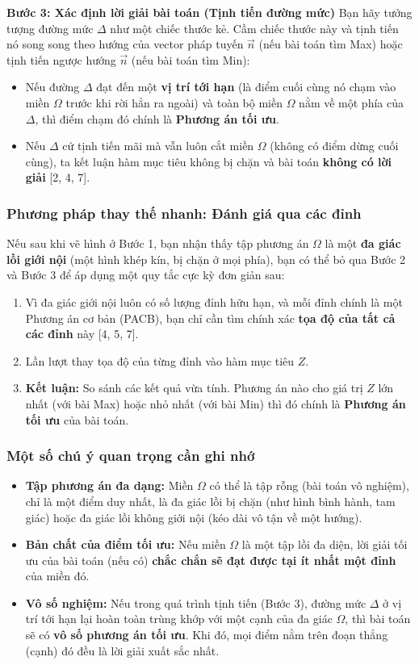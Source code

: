 \textbf{Bước 3: Xác định lời giải bài toán (Tịnh tiến đường mức)}
Bạn hãy tưởng tượng đường mức $\Delta$ như một chiếc thước kẻ. Cầm chiếc thước này và tịnh tiến nó song song theo hướng của vector pháp tuyến $\vec{n}$ (nếu bài toán tìm Max) hoặc tịnh tiến ngược hướng $\vec{n}$ (nếu bài toán tìm Min):
\begin{itemize}
    \item Nếu đường $\Delta$ đạt đến một \textbf{vị trí tới hạn} (là điểm cuối cùng nó chạm vào miền $\Omega$ trước khi rời hẳn ra ngoài) và toàn bộ miền $\Omega$ nằm về một phía của $\Delta$, thì điểm chạm đó chính là \textbf{Phương án tối ưu}.
    \item Nếu $\Delta$ cứ tịnh tiến mãi mà vẫn luôn cắt miền $\Omega$ (không có điểm dừng cuối cùng), ta kết luận hàm mục tiêu không bị chặn và bài toán \textbf{không có lời giải} [2, 4, 7].
\end{itemize}

\subsubsection{Phương pháp thay thế nhanh: Đánh giá qua các đỉnh}
Nếu sau khi vẽ hình ở Bước 1, bạn nhận thấy tập phương án $\Omega$ là một \textbf{đa giác lồi giới nội} (một hình khép kín, bị chặn ở mọi phía), bạn có thể bỏ qua Bước 2 và Bước 3 để áp dụng một quy tắc cực kỳ đơn giản sau:

\begin{enumerate}
    \item Vì đa giác giới nội luôn có số lượng đỉnh hữu hạn, và mỗi đỉnh chính là một Phương án cơ bản (PACB), bạn chỉ cần tìm chính xác \textbf{tọa độ của tất cả các đỉnh} này [4, 5, 7].
    \item Lần lượt thay tọa độ của từng đỉnh vào hàm mục tiêu $Z$.
    \item \textbf{Kết luận:} So sánh các kết quả vừa tính. Phương án nào cho giá trị $Z$ lớn nhất (với bài Max) hoặc nhỏ nhất (với bài Min) thì đó chính là \textbf{Phương án tối ưu} của bài toán.
\end{enumerate}

\subsubsection{Một số chú ý quan trọng cần ghi nhớ}
\begin{itemize}
    \item \textbf{Tập phương án đa dạng:} Miền $\Omega$ có thể là tập rỗng (bài toán vô nghiệm), chỉ là một điểm duy nhất, là đa giác lồi bị chặn (như hình bình hành, tam giác) hoặc đa giác lồi không giới nội (kéo dài vô tận về một hướng).
    \item \textbf{Bản chất của điểm tối ưu:} Nếu miền $\Omega$ là một tập lồi đa diện, lời giải tối ưu của bài toán (nếu có) \textbf{chắc chắn sẽ đạt được tại ít nhất một đỉnh} của miền đó.
    \item \textbf{Vô số nghiệm:} Nếu trong quá trình tịnh tiến (Bước 3), đường mức $\Delta$ ở vị trí tới hạn lại hoàn toàn trùng khớp với một cạnh của đa giác $\Omega$, thì bài toán sẽ có \textbf{vô số phương án tối ưu}. Khi đó, mọi điểm nằm trên đoạn thẳng (cạnh) đó đều là lời giải xuất sắc nhất.
\end{itemize}

